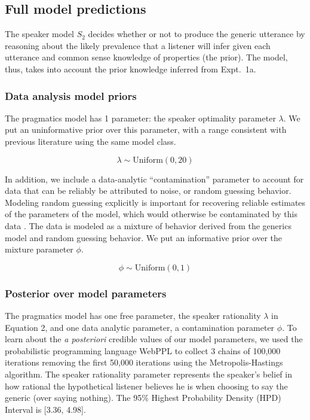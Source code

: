 \documentclass[10pt,letterpaper]{article}
\begin{document}
\subsection{Full model predictions}

The speaker model $S_2$ decides whether or not to produce the generic utterance by reasoning about the likely prevalence that a listener will infer given each utterance and common sense knowledge of properties (the prior). 
The model, thus, takes into account the prior knowledge inferred from Expt.~1a.

\subsubsection{Data analysis model priors}

The pragmatics model has 1 parameter: the speaker optimality parameter $\lambda$. 
We put an uninformative prior over this parameter, with a range consistent with previous literature using the same model class.

$$
\lambda \sim \text{Uniform}(0,20)
$$

In addition, we include a data-analytic ``contamination'' parameter to account for data that can be reliably be attributed to noise, or random guessing behavior.
Modeling random guessing explicitly is important for recovering reliable estimates of the parameters of the model, which would otherwise be contaminated by this data \cite{LW2014}.
The data is modeled as a mixture of behavior derived from the generics model and random guessing behavior. 
We put an informative prior over the mixture parameter $\phi$.

$$
\phi \sim \text{Uniform}(0,1)
$$


\subsubsection{Posterior over model parameters}

The pragmatics model has one free parameter, the speaker rationality $\lambda$ in Equation 2, and one data analytic parameter, a contamination parameter $\phi$.
To learn about the \emph{a posteriori} credible values of our model parameters, we used the probabilistic programming language WebPPL \cite{dippl} to collect 3 chains of 100,000 iterations removing the first 50,000 iterations using the Metropolis-Hastings algorithm. 
The speaker rationality parameter represents the speaker's belief in how rational the hypothetical listener believes he is when choosing to say the generic (over saying nothing). 
The 95\% Highest Probability Density (HPD) Interval is [3.36, 4.98].
\end{document}
